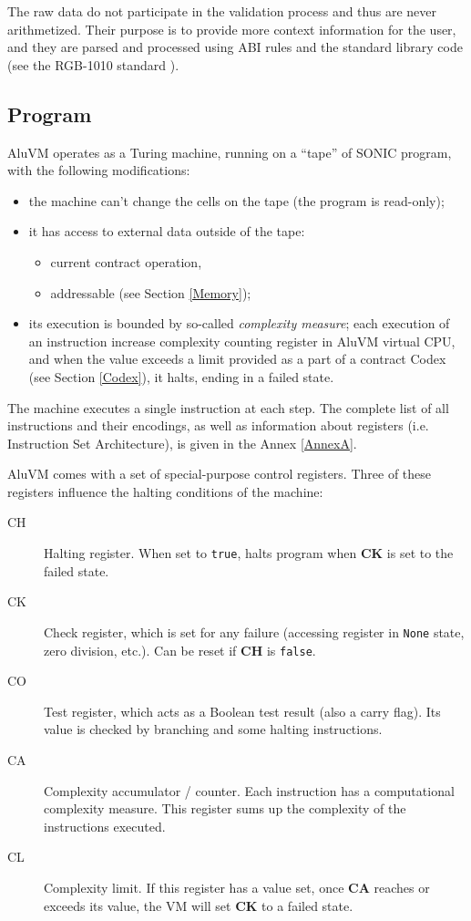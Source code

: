 \documentclass[a4paper]{article}
\begin{document}
\begin{multicols}{2}
The raw data do not participate in the validation process and thus are never arithmetized.
Their purpose is to provide more context information for the user, and they are parsed and processed
using ABI rules and the standard library code (see the RGB-1010 standard \cite{RGB1010}).


\subsection{Program}\label{Program}

AluVM operates as a Turing machine, running on a ``tape'' of SONIC program,
with the following modifications:

\begin{itemize}
\item the machine can't change the cells on the tape (the program is read-only);
\item it has access to external data outside of the tape:
    \begin{itemize}
    \item current contract operation,
    \item addressable (see Section \ref{Memory});
    \end{itemize}
\item its execution is bounded by so-called \emph{complexity measure};
  each execution of an instruction increase complexity counting register in AluVM virtual CPU,
  and when the value exceeds a limit provided as a part of a contract Codex (see Section \ref{Codex}),
  it halts, ending in a failed state.
\end{itemize}

The machine executes a single instruction at each step.
The complete list of all instructions and their encodings,
as well as information about registers (i.e. Instruction Set Architecture),
is given in the Annex \ref{AnnexA}.

AluVM comes with a set of special-purpose control registers.
Three of these registers influence the halting conditions of the machine:

\begin{description}
\item[CH] Halting register. When set to \texttt{true}, halts program when \textbf{CK} is set to the failed state.
\item[CK] Check register, which is set for any failure (accessing register in \texttt{None} state, zero
        division, etc.). Can be reset if \textbf{CH} is \texttt{false}.
\item[CO] Test register, which acts as a Boolean test result (also a carry flag).
        Its value is checked by branching and some halting instructions.
\item[CA] Complexity accumulator / counter.
        Each instruction has a computational complexity measure.
        This register sums up the complexity of the instructions executed.
\item[CL] Complexity limit. If this register has a value set, once \textbf{CA} reaches or exceeds its value,
        the VM will set \textbf{CK} to a failed state.
\end{description}


\end{multicols}
\end{document}
